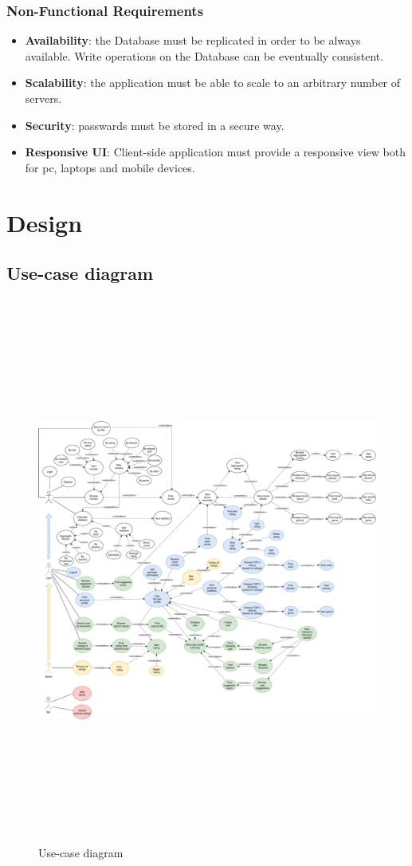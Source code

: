 \documentclass[11pt]{article}
\begin{document}
\subsubsection{Non-Functional Requirements}
\begin{itemize}
	\item \textbf{Availability}: the Database must be replicated in order to be always available.
	Write operations on the Database can be eventually consistent.
	\item \textbf{Scalability}: the application must be able to scale to an arbitrary number of servers.
	\item \textbf{Security}: passwards must be stored in a secure way.
	\item \textbf{Responsive UI}: Client-side application must provide a responsive view both for pc, 
	laptops and mobile devices.
\end{itemize}

\section{Design}

\subsection{Use-case diagram}

\begin{figure}
    \centering
    \includegraphics[height=18cm]{figs/use_case.pdf}
    \caption{Use-case diagram}
    \label{fig:usecase}
\end{figure}
\end{document}
